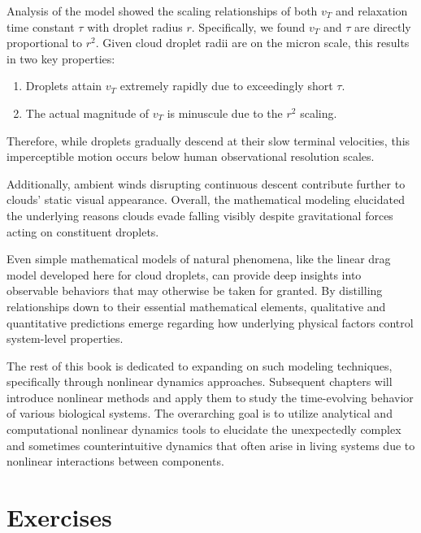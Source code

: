 Analysis of the model showed the scaling relationships of both $v_T$ and relaxation time constant $\tau$ with droplet radius $r$. Specifically, we found $v_T$ and $\tau$ are directly proportional to $r^2$. Given cloud droplet radii are on the micron scale, this results in two key properties:
\begin{enumerate}
    \item Droplets attain $v_T$ extremely rapidly due to exceedingly short $\tau$.

    \item The actual magnitude of $v_T$ is minuscule due to the $r^2$ scaling.
\end{enumerate}
Therefore, while droplets gradually descend at their slow terminal velocities, this imperceptible motion occurs below human observational resolution scales.

Additionally, ambient winds disrupting continuous descent contribute further to clouds' static visual appearance. Overall, the mathematical modeling elucidated the underlying reasons clouds evade falling visibly despite gravitational forces acting on constituent droplets.

Even simple mathematical models of natural phenomena, like the linear drag model developed here for cloud droplets, can provide deep insights into observable behaviors that may otherwise be taken for granted. By distilling relationships down to their essential mathematical elements, qualitative and quantitative predictions emerge regarding how underlying physical factors control system-level properties. 

The rest of this book is dedicated to expanding on such modeling techniques, specifically through nonlinear dynamics approaches. Subsequent chapters will introduce nonlinear methods and apply them to study the time-evolving behavior of various biological systems. The overarching goal is to utilize analytical and computational nonlinear dynamics tools to elucidate the unexpectedly complex and sometimes counterintuitive dynamics that often arise in living systems due to nonlinear interactions between components.

\section*{Exercises}

